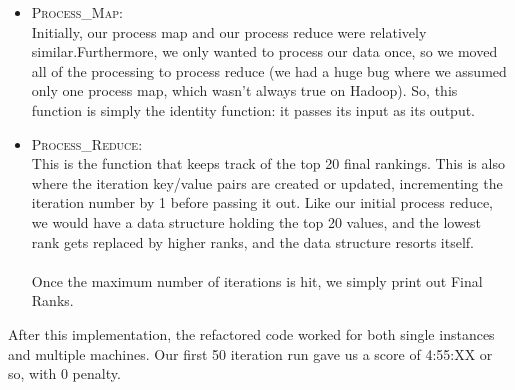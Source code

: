 \begin{itemize}
    \\ \\
    We did notice, however, that some datasets that we mined did not include NodeId entries for nodes that did not have any outgoing edges. The given datasets that were given did include entries for no outgoing edges, but according to Piazza, there may also be cases where no entries exist for such nodes. In this case, we would simply just create a new key/value pair with that NodeId, so we would be essentially adding an entry.
    \\ \\
    Just like PageRank Map, we do not deal with iterations here. We just pass them along.

    The output for this function is simply:
    \begin{center}
      NodeId:[NODEID] \hspace{8mm} [CURRENT\_RANK],[ADJACENCY\_LIST]
    \end{center}
    or
    \begin{center}
      `Iters' \hspace{8mm} [ITERATIONS]
    \end{center}

  \item \textsc{Process\_Map}: \\
    Initially, our process map and our process reduce were relatively similar.Furthermore, we only wanted to process our data once, so we moved all of the processing to process reduce (we had a huge bug where we assumed only one process map, which wasn't always true on Hadoop). So, this function is simply the identity function: it passes its input as its output.

  \item \textsc{Process\_Reduce}: \\
    This is the function that keeps track of the top 20 final rankings. This is also where the iteration key/value pairs are created or updated, incrementing the iteration number by 1 before passing it out. Like our initial process reduce, we would have a data structure holding the top 20 values, and the lowest rank gets replaced by higher ranks, and the data structure resorts itself.
    \\ \\
    Once the maximum number of iterations is hit, we simply print out Final Ranks.
\end{itemize}
After this implementation, the refactored code worked for both single instances and multiple machines. Our first 50 iteration run gave us a score of 4:55:XX or so, with 0 penalty. 

